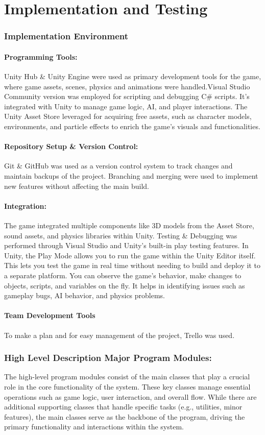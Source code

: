 \chapter{Implementation and Testing}
\subsection{Implementation Environment}
\subsubsection{Programming Tools:}
Unity Hub \& Unity Engine were used as primary development tools for the game, where game assets, scenes, physics and animations were handled.Visual Studio Community version was employed for scripting and debugging C\# scripts. It's integrated with Unity to manage game logic, AI, and player interactions.
The Unity Asset Store leveraged for acquiring free assets, such as character models, environments, and particle effects to enrich the game's visuals and functionalities.
\subsubsection{Repository Setup \& Version Control:}
Git \& GitHub was used as a version control system to track changes and maintain backups of the project. Branching and merging were used to implement new features without affecting the main build.
\subsubsection{Integration:}
The game integrated multiple components like 3D models from the Asset Store, sound assets, and physics libraries within Unity.
Testing \& Debugging was performed through Visual Studio and Unity’s built-in play testing features.
In Unity, the Play Mode allows you to run the game within the Unity Editor itself. This lets you test the game in real time without needing to build and deploy it to a separate platform.
You can observe the game’s behavior, make changes to objects, scripts, and variables on the fly.
It helps in identifying issues such as gameplay bugs, AI behavior, and physics problems.
\subsubsection{Team Development Tools}
To make a plan and for easy management of the project, Trello was used.
\subsection{High Level Description Major Program Modules:}
The high-level program modules consist of the main classes that play a crucial role in the core functionality of the system. These key classes manage essential operations such as game logic, user interaction, and overall flow. While there are additional supporting classes that handle specific tasks (e.g., utilities, minor features), the main classes serve as the backbone of the program, driving the primary functionality and interactions within the system.
